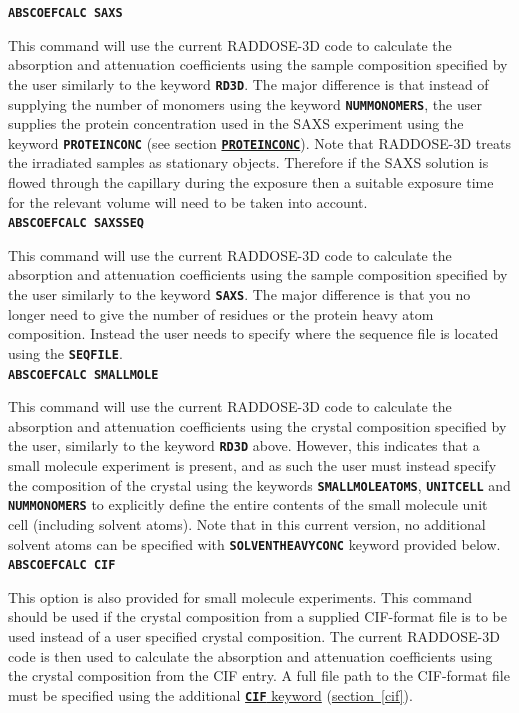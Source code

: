 \documentclass[a4paper]{article}
\newcommand{\Keyword}[1]{\texttt{\textbf{#1}}\xspace}
\newcommand{\SB}{\\[0.2em]}
\begin{document}
\noindent \Keyword{ABSCOEFCALC SAXS}

This command will use the current RADDOSE-3D code to calculate the absorption and attenuation coefficients using the sample composition specified by the user similarly to the keyword \Keyword{RD3D}. The major difference is that instead of supplying the number of monomers using the keyword \Keyword{NUMMONOMERS}, the user supplies the protein concentration used in the SAXS experiment using the keyword \Keyword{PROTEINCONC} (see section \hyperref[proteinconc]{\Keyword{PROTEINCONC}}).
\newline
Note that RADDOSE-3D treats the irradiated samples as stationary objects. Therefore if the SAXS solution is flowed through the capillary during the exposure then a suitable exposure time for the relevant volume will need to be taken into account.\SB


\noindent \Keyword{ABSCOEFCALC SAXSSEQ}

This command will use the current RADDOSE-3D code to calculate the absorption and attenuation coefficients using the sample composition specified by the user similarly to the keyword \Keyword{SAXS}. The major difference is that you no longer need to give the number of residues or the protein heavy atom composition. Instead the user needs to specify where the sequence file is located using the \Keyword{SEQFILE}.\SB


\noindent \Keyword{ABSCOEFCALC SMALLMOLE}

This command will use the current RADDOSE-3D code to calculate the absorption and attenuation coefficients using the crystal composition specified by the user, similarly to the keyword \Keyword{RD3D} above. However, this indicates that a small molecule experiment is present, and as such the user must instead specify the composition of the crystal using the keywords \Keyword{SMALLMOLEATOMS}, \Keyword{UNITCELL} and \Keyword{NUMMONOMERS} to explicitly define the entire contents of the small molecule unit cell (including solvent atoms). Note that in this current version, no additional solvent atoms can be specified with \Keyword{SOLVENTHEAVYCONC} keyword provided below. \SB


\noindent \Keyword{ABSCOEFCALC CIF}

This option is also provided for small molecule experiments. This command should be used if the crystal composition from a supplied CIF-format file is to be used instead of a user specified crystal composition. The current RADDOSE-3D code is then used to calculate the absorption and attenuation coefficients using the crystal composition from the CIF entry. A full file path to the CIF-format file must be specified using the additional \hyperref[cif]{\Keyword{CIF} keyword}  (\hyperref[cif]{section~\ref*{cif}}).
\end{document}
